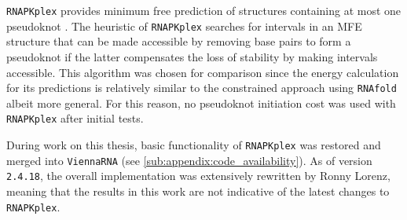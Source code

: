 \documentclass[../../master.tex]{subfiles}
\begin{document}
\texttt{RNAPKplex} provides minimum free prediction of structures containing at most one pseudoknot \parencite{lorenz_viennarna_2011, beyer_rna_2010}.
The heuristic of \texttt{RNAPKplex} searches for intervals in an MFE structure that can be made accessible by removing base pairs to form a pseudoknot if the latter compensates the loss of stability by making intervals accessible.
This algorithm was chosen for comparison since the energy calculation for its predictions is relatively similar to the constrained approach using \texttt{RNAfold} albeit more general.
For this reason, no pseudoknot initiation cost was used with \texttt{RNAPKplex} after initial tests.

During work on this thesis, basic functionality of \texttt{RNAPKplex} was restored and merged into \texttt{ViennaRNA} (see \autoref{sub:appendix:code_availability}).
As of version \texttt{2.4.18}, the overall implementation was extensively rewritten by Ronny Lorenz, meaning that the results in this work are not indicative of the latest changes to \texttt{RNAPKplex}.

\end{document}
